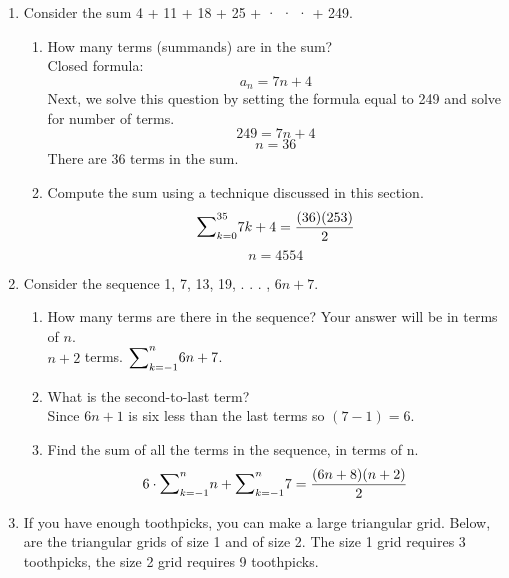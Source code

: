 \documentclass[11pt,a4paper]{article}
\newcommand\setItemNumber[1]{\setcounter{enumi}{\numexpr#1-1\relax}}
\begin{document}
\begin{enumerate}
            \setItemNumber{3}
            \item Consider the sum 4 + 11 + 18 + 25 + · · · + 249.
                \begin{enumerate}
                    \item How many terms (summands) are in the sum?\\
                        Closed formula:\\
                        $$a_n = 7n + 4$$
                        Next, we solve this question by setting the formula equal to 249 and solve for number of terms.\\
                        $$249 = 7n + 4$$
                        $$n = 36$$
                        There are 36 terms in the sum.\\
                    \item Compute the sum using a technique discussed in this section.\\
                        $${\mathlarger{\sum}}_{k=0}^{35}7k + 4 = \frac{(36)(253)}{2}$$
                        $$ n = 4554$$
                \end{enumerate}

            \item Consider the sequence 1, 7, 13, 19, . . . , $6n + 7$.
                \begin{enumerate}
                    \item How many terms are there in the sequence? Your answer will be in terms of $n$.\\
                        $n + 2$ terms. ${\mathlarger{\sum}}_{k = -1}^{n} 6n +7$.
                    \item What is the second-to-last term?\\
                        Since $6n + 1$ is six less than the last terms so $(7 -1) = 6$.
                    \item Find the sum of all the terms in the sequence, in terms of n.\\
                        $$ 6\cdot{\mathlarger{\sum}}_{k=-1}^{n}n + {\mathlarger{\sum}}_{k=-1}^{n}7 = \frac{(6n+8)(n+2)}{2}$$

                \end{enumerate}


            \setItemNumber{13}
            \item If you have enough toothpicks, you can make a large triangular grid. Below, are the triangular grids of size 1 and of size 2. The size 1 grid requires 3 toothpicks, the size 2 grid requires 9 toothpicks.


\end{enumerate}
\end{document}
